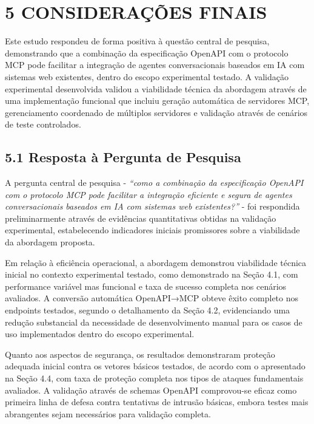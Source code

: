 \documentclass[
]{article}
\begin{document}
\section{5 CONSIDERAÇÕES FINAIS}\label{considerauxe7uxf5es-finais}

Este estudo respondeu de forma positiva à questão central de pesquisa,
demonstrando que a combinação da especificação OpenAPI com o protocolo
MCP pode facilitar a integração de agentes conversacionais baseados em
IA com sistemas web existentes, dentro do escopo experimental testado. A
validação experimental desenvolvida validou a viabilidade técnica da
abordagem através de uma implementação funcional que incluiu geração
automática de servidores MCP, gerenciamento coordenado de múltiplos
servidores e validação através de cenários de teste controlados.

\subsection{5.1 Resposta à Pergunta de
Pesquisa}\label{resposta-uxe0-pergunta-de-pesquisa}

A pergunta central de pesquisa - \emph{``como a combinação da
especificação OpenAPI com o protocolo MCP pode facilitar a integração
eficiente e segura de agentes conversacionais baseados em IA com
sistemas web existentes?''} - foi respondida preliminarmente através de
evidências quantitativas obtidas na validação experimental,
estabelecendo indicadores iniciais promissores sobre a viabilidade da
abordagem proposta.

Em relação à eficiência operacional, a abordagem demonstrou viabilidade
técnica inicial no contexto experimental testado, como demonstrado na
Seção 4.1, com performance variável mas funcional e taxa de sucesso
completa nos cenários avaliados. A conversão automática OpenAPI→MCP
obteve êxito completo nos endpoints testados, segundo o detalhamento da
Seção 4.2, evidenciando uma redução substancial da necessidade de
desenvolvimento manual para os casos de uso implementados dentro do
escopo experimental.

Quanto aos aspectos de segurança, os resultados demonstraram proteção
adequada inicial contra os vetores básicos testados, de acordo com o
apresentado na Seção 4.4, com taxa de proteção completa nos tipos de
ataques fundamentais avaliados. A validação através de schemas OpenAPI
comprovou-se eficaz como primeira linha de defesa contra tentativas de
intrusão básicas, embora testes mais abrangentes sejam necessários para
validação completa.
\end{document}
